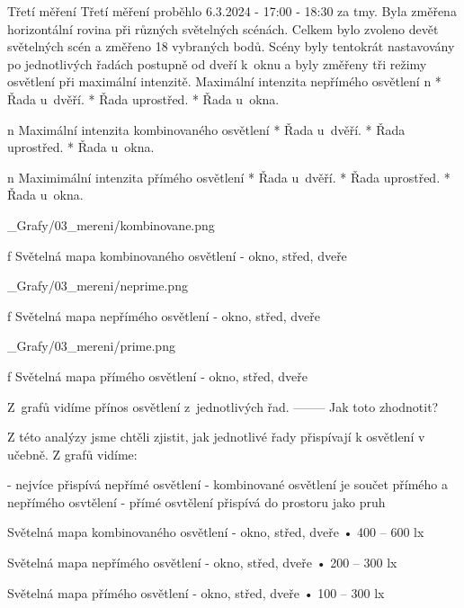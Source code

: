 \sec Třetí měření
Třetí měření proběhlo 6.3.2024 - 17:00 - 18:30 za tmy. Byla změřena horizontální rovina při různých světelných scénách.
Celkem bylo zvoleno devět světelných scén a změřeno 18 vybraných bodů. Scény byly tentokrát nastavovány po jednotlivých
řadách postupně od dveří k~oknu a byly změřeny tři režimy osvětlení při maximální intenzitě.
\medskip
{\sbf Maximální intenzita nepřímého osvětlení}
\medskip
\begitems \style n
    * Řada u~dvěří.
    * Řada uprostřed.
    * Řada u~okna.
\enditems

\medskip
\begitems \style n
{\sbf Maximální intenzita kombinovaného osvětlení}
\medskip
    * Řada u~dvěří.
    * Řada uprostřed.
    * Řada u~okna.
\enditems
\medskip

\begitems \style n
{\sbf Maximimální intenzita přímého osvětlení}
\medskip
    * Řada u~dvěří.
    * Řada uprostřed.
    * Řada u~okna.
\enditems

\medskip {}
\picw=18cm _Grafy/03_mereni/kombinovane.png
\caption/f Světelná mapa kombinovaného osvětlení - okno, střed, dveře
\medskip

\medskip {}
\picw=18cm _Grafy/03_mereni/neprime.png
\caption/f Světelná mapa nepřímého osvětlení - okno, střed, dveře
\medskip

\medskip {}
\picw=18cm _Grafy/03_mereni/prime.png
\caption/f Světelná mapa přímého osvětlení - okno, střed, dveře
\medskip

Z~grafů vidíme přínos osvětlení z~jednotlivých řad. -------- Jak toto zhodnotit?

\medskip
Z této analýzy jsme chtěli zjistit, jak jednotlivé řady přispívají k osvětlení v učebně. Z grafů vidíme:

- nejvíce přispívá nepřímé osvětlení
- kombinované osvětlení je součet přímého a nepřímého osvtělení
- přímé osvtělení přispívá do prostoru jako pruh

Světelná mapa kombinovaného osvětlení - okno, střed, dveře
    • 400 – 600 lx

Světelná mapa nepřímého osvětlení - okno, střed, dveře
    • 200 – 300 lx

Světelná mapa přímého osvětlení - okno, střed, dveře
    • 100 – 300 lx